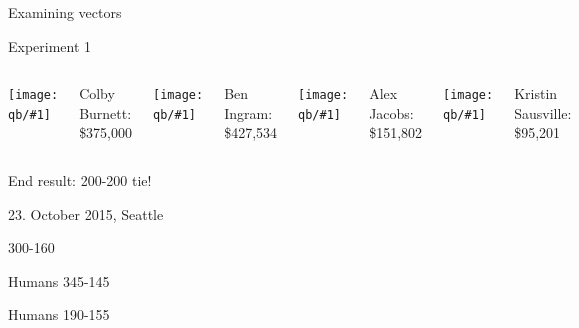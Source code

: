 \documentclass[compress]{beamer}
\newcommand{\fsi}[2]{
\begin{frame}[plain]
\vspace*{-1pt}
\makebox[\linewidth]{\texttt{[image: \#1]}}
\begin{center}
#2
\end{center}
\end{frame}
}
\newcommand{\gfxq}[2]{
\begin{center}
	\texttt{[image: qb/\#1]}
\end{center}
}
\begin{document}
\begin{frame}{Examining vectors}

  \only<1>{\gfxq{mann}{.65}}

\end{frame}

\begin{frame}{Experiment 1}

		\begin{columns}
				\gfxq{colby_jeo}{1.0}
                                Colby Burnett:
                                \$375,000
				\gfxq{ben_jeo}{1.0}
                                Ben Ingram:
                                \$427,534
				\gfxq{alex_jeo}{1.0}
                                Alex Jacobs: \$151,802
				\gfxq{kristin_jeo}{1.0}
                                Kristin Sausville: \$95,201
		\end{columns}

                \pause


                \begin{center}
                End result: 200-200 tie!
                \end{center}

\end{frame}

\fsi{qb/hsnct1}{}
\fsi{qb/jennings}{23. October 2015, Seattle}
\fsi{qb/jennings_handshake}{300-160}

\fsi{qb/nasat}{Humans 345-145}
\fsi{qb/hsnct_2016}{Humans 190-155}
\end{document}
